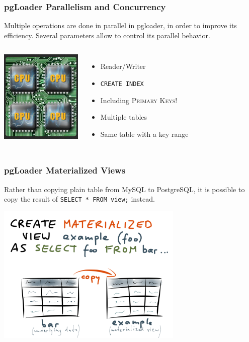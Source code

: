 \documentclass{beamer}
\begin{document}
\begin{frame}[fragile]
  \frametitle{pgLoader Parallelism and Concurrency}

  Multiple operations are done in parallel in pgloader, in order to improve
  its efficiency. Several parameters allow to control its parallel behavior.
  
  \begin{columns}[c]
    \begin{center}
      \includegraphics[height=12em]{multi-core-cpu.jpg}
    \end{center}

      \begin{itemize}
      \item Reader/Writer
      \item \texttt{CREATE INDEX}
      \item Including \textsc{Primary Keys!}
      \item Multiple tables
      \item Same table with a key range
    \end{itemize}

  \end{columns}  
\end{frame}

\begin{frame}[fragile]
  \frametitle{pgLoader Materialized Views}

  Rather than copying plain table from MySQL to PostgreSQL, it is possible
  to copy the result of \texttt{SELECT * FROM view;} instead.
  
  \begin{center}
    \includegraphics[height=18em]{slide-22.png}
  \end{center}
\end{frame}
\end{document}
